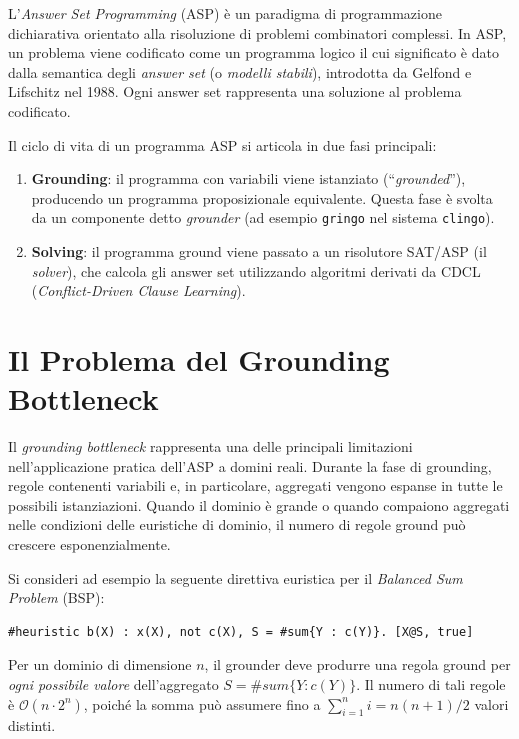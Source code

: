 \documentclass[a4paper,12pt,twoside,openright]{report}
\newcommand{\clingo}{\texttt{clingo}}
\newcommand{\cdcl}{\textsc{CDCL}}
\begin{document}
L'\emph{Answer Set Programming} (ASP) \`{e} un paradigma di programmazione dichiarativa orientato alla risoluzione di problemi combinatori complessi. In ASP, un problema viene codificato come un programma logico il cui significato \`{e} dato dalla semantica degli \emph{answer set} (o \emph{modelli stabili}), introdotta da Gelfond e Lifschitz nel 1988. Ogni answer set rappresenta una soluzione al problema codificato.

Il ciclo di vita di un programma ASP si articola in due fasi principali:
\begin{enumerate}
    \item \textbf{Grounding}: il programma con variabili viene istanziato (``\emph{grounded}''), producendo un programma proposizionale equivalente. Questa fase \`{e} svolta da un componente detto \emph{grounder} (ad esempio \texttt{gringo} nel sistema \clingo{}).
    \item \textbf{Solving}: il programma ground viene passato a un risolutore SAT/ASP (il \emph{solver}), che calcola gli answer set utilizzando algoritmi derivati da \cdcl{} (\emph{Conflict-Driven Clause Learning}).
\end{enumerate}

\section{Il Problema del Grounding Bottleneck}
\label{sec:grounding_bottleneck}

Il \emph{grounding bottleneck} rappresenta una delle principali limitazioni nell'applicazione pratica dell'ASP a domini reali. Durante la fase di grounding, regole contenenti variabili e, in particolare, aggregati vengono espanse in tutte le possibili istanziazioni. Quando il dominio \`{e} grande o quando compaiono aggregati nelle condizioni delle euristiche di dominio, il numero di regole ground pu\`{o} crescere esponenzialmente.

Si consideri ad esempio la seguente direttiva euristica per il \emph{Balanced Sum Problem} (BSP):
\begin{lstlisting}[caption={Euristica di dominio con aggregato nella condizione}]
#heuristic b(X) : x(X), not c(X), S = #sum{Y : c(Y)}. [X@S, true]
\end{lstlisting}

Per un dominio di dimensione $n$, il grounder deve produrre una regola ground per \emph{ogni possibile valore} dell'aggregato $S = \#sum\{Y : c(Y)\}$. Il numero di tali regole \`{e} $\mathcal{O}(n \cdot 2^n)$, poich\'{e} la somma pu\`{o} assumere fino a $\sum_{i=1}^{n} i = n(n+1)/2$ valori distinti.
\end{document}
